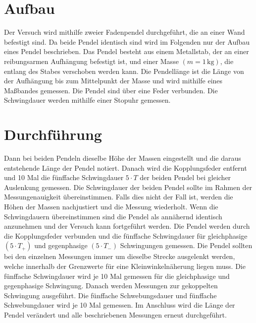\section{Aufbau}
\label{sec:Aufbau}
Der Versuch wird mithilfe zweier Fadenpendel durchgeführt, die an einer Wand befestigt sind. Da beide Pendel identisch sind wird im Folgenden 
nur der Aufbau eines Pendel beschrieben. 
Das Pendel besteht aus einem Metallstab, der an einer reibungsarmen Aufhängung befestigt ist, und einer Masse $(m = 1 \,\unit{\kilo\gram})$, 
die entlang des Stabes verschoben werden kann. Die Pendellänge ist die Länge von der Aufhängung bis zum Mittelpunkt der Masse und wird mithilfe eines 
Maßbandes gemessen.
Die Pendel sind über eine Feder verbunden. Die Schwingdauer werden mithilfe einer Stopuhr gemessen. 

\section{Durchführung}
\label{sec:Durchführung}
Dann bei beiden Pendeln dieselbe Höhe der Massen eingestellt und die daraus entstehende Länge der Pendel notiert. 
Danach wird die Kopplungsfeder entfernt und 10 Mal die fünffache Schwingdauer $5 \cdot T$ der beiden Pendel bei gleicher Auslenkung gemessen. Die Schwingdauer der beiden Pendel sollte im
Rahmen der Messungenauigkeit übereinstimmen. Falls dies nicht der Fall ist, werden die Höhen der Massen nachjustiert und die Messung wiederholt.
Wenn die Schwingdauern übereinstimmen sind die Pendel als annähernd identisch anzunehmen und der Versuch kann fortgeführt werden. 
Die Pendel werden durch die Kopplungsfeder verbunden und die fünffache Schwingdauer für gleichphasige $(5 \cdot T_+)$ und gegenphasige $(5 \cdot T_-)$ 
Schwingungen gemessen. 
Die Pendel sollten bei den einzelnen Messungen immer um dieselbe Strecke ausgelenkt werden, welche innerhalb der Grenzwerte für eine Kleinwinkelnäherung
liegen muss. Die fünffache Schwingdauer wird je 10 Mal gemessen für die gleichphasige und gegenphasige Schwingung. 
Danach werden Messungen zur gekoppelten Schwingung ausgeführt. Die fünffache Schwebungsdauer und fünffache Schwebungdauer wird je 10 Mal gemessen. 
Im Anschluss wird die Länge der Pendel verändert und alle beschriebenen Messungen erneut durchgeführt. 

